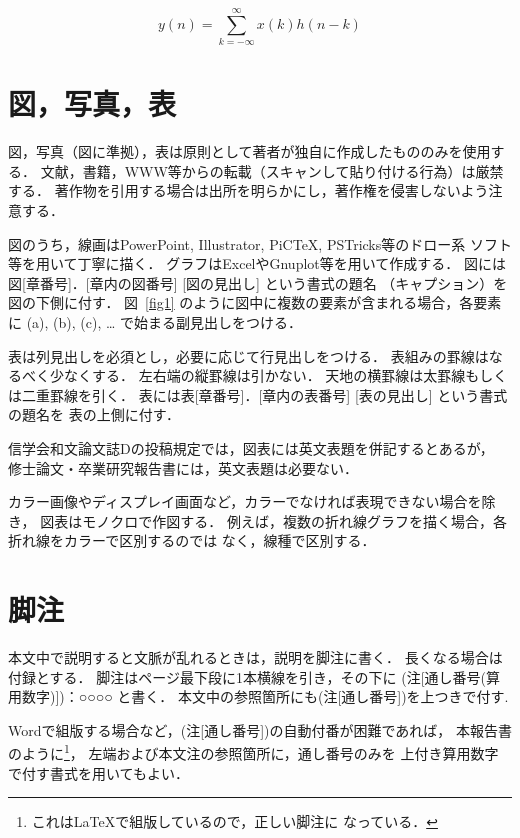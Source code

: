 \documentclass[main]{subfiles}
\begin{document}
\begin{equation}
y(n)=\sum_{k=-\infty}^{\infty}x(k)h(n-k)\label{eqn1}
\end{equation}

\section{図，写真，表}
図，写真（図に準拠），表は原則として著者が独自に作成したもののみを使用する．
文献，書籍，WWW等からの転載（スキャンして貼り付ける行為）は厳禁する．
著作物を引用する場合は出所を明らかにし，著作権を侵害しないよう注意する．

図のうち，線画はPowerPoint, Illustrator, PiC\TeX, PSTricks等のドロー系
ソフト等を用いて丁寧に描く．
グラフはExcelやGnuplot等を用いて作成する．
図には図[章番号]．[章内の図番号] [図の見出し] という書式の題名
（キャプション）を図の下側に付す．
図~\ref{fig1} のように図中に複数の要素が含まれる場合，各要素に
(a), (b), (c), … で始まる副見出しをつける．

表は列見出しを必須とし，必要に応じて行見出しをつける．
表組みの罫線はなるべく少なくする．
左右端の縦罫線は引かない．
天地の横罫線は太罫線もしくは二重罫線を引く．
表には表[章番号]．[章内の表番号] [表の見出し] という書式の題名を
表の上側に付す．

信学会和文論文誌Dの投稿規定では，図表には英文表題を併記するとあるが，
修士論文・卒業研究報告書には，英文表題は必要ない．

カラー画像やディスプレイ画面など，カラーでなければ表現できない場合を除き，
図表はモノクロで作図する．
例えば，複数の折れ線グラフを描く場合，各折れ線をカラーで区別するのでは
なく，線種で区別する．

\section{脚注}
本文中で説明すると文脈が乱れるときは，説明を脚注に書く．
長くなる場合は付録とする．
脚注はページ最下段に1本横線を引き，その下に
 (注[通し番号(算用数字)])：○○○○ と書く．
本文中の参照箇所にも(注[通し番号])を上つきで付す.

Wordで組版する場合など，(注[通し番号])の自動付番が困難であれば，
本報告書のように\footnote{これは\LaTeX で組版しているので，正しい脚注に
	なっている．}，
左端および本文注の参照箇所に，通し番号のみを
上付き算用数字で付す書式を用いてもよい．
\end{document}
